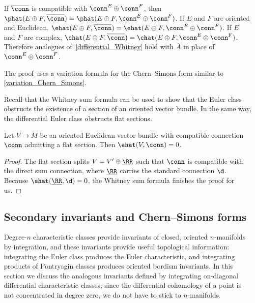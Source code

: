 \begin{thm}
	If $\overline{\conn}$ is compatible with $\conn^E\oplus\conn^F$, then $\phat(E\oplus F, \overline{\conn}) =
	\phat(E\oplus F,  \conn^E\oplus \conn^F)$. If $E$ and $F$ are oriented and Euclidean, $\ehat(E\oplus F,
	\overline{\conn}) = \ehat(E\oplus F,  \conn^E\oplus \conn^F)$. If $E$ and $F$ are complex, $\chat(E\oplus F,
	\overline{\conn}) = \chat(E\oplus F,  \conn^E\oplus \conn^F)$. Therefore analogues of~\eqref{differential_Whitney}
	hold with $\overline A$ in place of $ \conn^E\oplus \conn^F$.
\end{thm}

\noindent The proof uses a variation formula for the Chern--Simons form similar to \cref{variation_Chern_Simons}.

Recall that the Whitney sum formula can be used to show that the Euler class obstructs the existence of
a section of an oriented vector bundle. In the same way, the differential Euler class obstructs flat sections.

\begin{lem}
	Let $V\to M$ be an oriented Euclidean vector bundle with compatible connection $\conn$ admitting a flat section.
	Then $\ehat(V, \conn) = 0$.
\end{lem}

\begin{proof}
	The flat section splits $V = V'\oplus\underline{\RR}$ such that $\conn$ is compatible with the direct sum
	connection, where $\underline{\RR}$ carries the standard connection $\d$.  Because $\ehat(\underline{\RR}, \d) =
	0$, the Whitney sum formula finishes the proof for us.
\end{proof}


\subsection{Secondary invariants and Chern--Simons forms}
\label{secondary_invariants}
Degree-$n$ characteristic classes provide invariants of closed, oriented $n$-manifolds by integration, and these
invariants provide useful topological information: integrating the Euler class produces the Euler characteristic,
and integrating products of Pontryagin classes produces oriented bordism invariants. In this section we discuss
the analogous invariants defined by integrating on-diagonal differential characteristic classes; since the
differential cohomology of a point is not concentrated in degree zero, we do not have to stick to $n$-manifolds.

